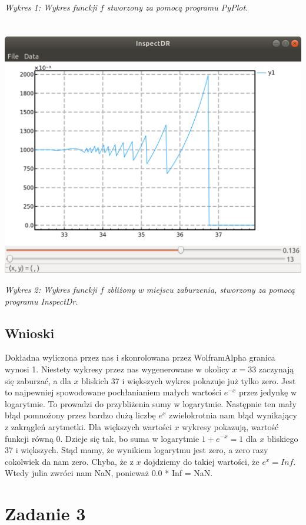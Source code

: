 \documentclass[]{article}
\begin{document}
\textit{Wykres 1: Wykres funckji $f$ stworzony za pomocą programu PyPlot.}
\\\\\\
\includegraphics[scale=0.25]{InspectorDrZad2.png}

\textit{Wykres 2: Wykres funckji $f$ zbliżony w miejscu zaburzenia, stworzony za pomocą programu InspectDr.}
\newpage
\subsection{Wnioski}
Dokładna wyliczona przez nas i skonrolowana przez WolframAlpha granica wynosi 1. Niestety wykresy przez nas wygenerowane w okolicy $x = 33$ zaczynają się zaburzać, a dla $x$ bliskich 37 i większych wykres pokazuje już tylko zero. Jest to najpewniej spowodowane pochłanianiem małych wartości $e^{-x}$ przez jedynkę w logarytmie. To prowadzi do przybliżenia sumy w logarytmie. Następnie ten mały błąd pomnożony przez bardzo dużą liczbę $e^x$ zwielokrotnia nam błąd wynikający z zakrągleń arytmetki. Dla większych wartości $x$ wykresy pokazują, wartość funkcji równą 0. Dzieje się tak, bo suma w logarytmie $1+e^{-x} = 1$ dla $x$ bliskiego 37 i większych. Stąd mamy, że wynikiem logarytmu jest zero, a zero razy cokolwiek da nam zero. Chyba, że z $x$ dojdziemy do takiej wartości, że $e^x = Inf$. Wtedy julia zwróci nam NaN, ponieważ 0.0 * Inf = NaN.
\section{Zadanie 3}
\end{document}
